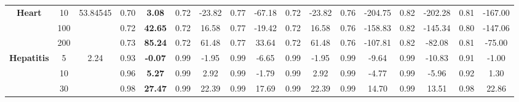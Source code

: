 \documentclass[letterpaper]{article}
\theoremstyle{definition}
\begin{document}
\begin{table}[h]
\begin{tabular}{|c|c|c|c|c|c|c|c|c|c|c|c|c|c|c|c|c|}
\multirow{3}{*}{\textbf{Heart}}     & 10       & 53.84545 & 0.70  & \textbf{3.08}    & 0.72  & -23.82           & 0.77   & -67.18            & 0.72      & -23.82       & 0.76  & -204.75          & 0.82     & -202.28            & 0.81   & -167.00          \\ \cline{2-17} 
                                    & 100      &          & 0.72  & \textbf{42.65}   & 0.72  & 16.58            & 0.77   & -19.42            & 0.72      & 16.58        & 0.76  & -158.83          & 0.82     & -145.34            & 0.80   & -147.06          \\ \cline{2-17} 
                                    & 200      &          & 0.73  & \textbf{85.24}   & 0.72  & 61.48            & 0.77   & 33.64             & 0.72      & 61.48        & 0.76  & -107.81          & 0.82     & -82.08             & 0.81   & -75.00           \\ \hline
\multirow{3}{*}{\textbf{Hepatitis}} & 5        & 2.24     & 0.93  & \textbf{-0.07}   & 0.99      & -1.95        & 0.99   & -6.65             & 0.99      & -1.95        & 0.99  & -9.64            & 0.99     & -10.83             & 0.91    & -1.00           \\ \cline{2-17} 
                                    & 10       &          & 0.96  & \textbf{5.27}    & 0.99      & 2.92         & 0.99   & -1.79             & 0.99      & 2.92         & 0.99  & -4.77            & 0.99     & -5.96              & 0.92    & 1.30            \\ \cline{2-17} 
                                    & 30       &          & 0.98  & \textbf{27.47}   & 0.99      & 22.39        & 0.99   & 17.69             & 0.99      & 22.39        & 0.99  & 14.70            & 0.99     & 13.51              & 0.98    & 22.86           \\ \hline


\end{tabular}
\end{table}
\end{document}
